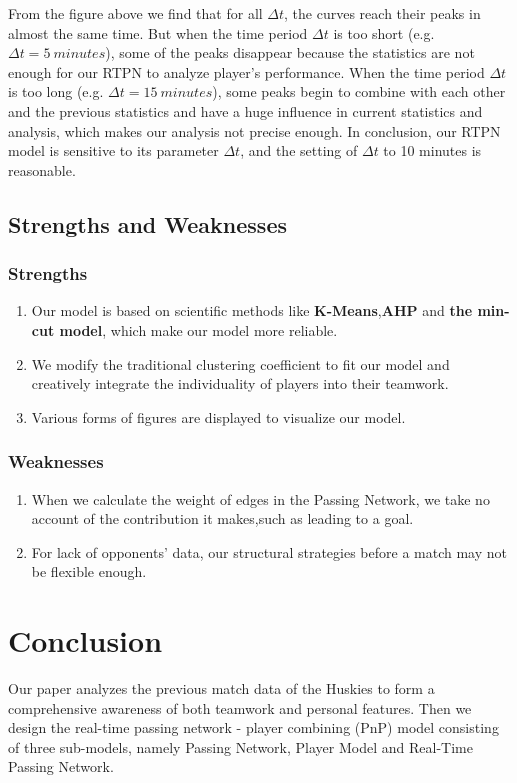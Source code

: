 \documentclass{mcmthesis}
\begin{document}
From the figure above we find that for all $\Delta{t}$, the curves reach their peaks in almost the same time. But when the time period $\Delta{t}$ is too short (e.g. $\Delta{t} = 5\ minutes$), some of the peaks disappear because the statistics are not enough for our RTPN to analyze player's performance. When the time period $\Delta{t}$ is too long (e.g. $\Delta{t} = 15\ minutes$), some peaks begin to combine with each other and the previous statistics and have a huge influence in current statistics and analysis, which makes our analysis not precise enough. In conclusion, our RTPN model is sensitive to its parameter $\Delta{t}$, and the setting of $\Delta{t}$ to 10 minutes is reasonable.

\subsection{Strengths and Weaknesses}
\subsubsection{Strengths}
\begin{enumerate}
\item Our model is based on scientific methods like \textbf{K-Means},\textbf{AHP} and \textbf{the min-cut model}, which make our model more reliable.
\item We modify the traditional clustering coefficient to fit our model and creatively integrate the individuality of players into their teamwork.
\item Various forms of figures are displayed to visualize our model.
\end{enumerate}
\subsubsection{Weaknesses}
\begin{enumerate}
\item When we calculate the weight of edges in the Passing Network, we take no account of the contribution it makes,such as leading to a goal.
\item For lack of opponents' data, our structural strategies before a match may not be flexible enough.
\end{enumerate}


\section{Conclusion} \label{Sec-Conclusion}
Our paper analyzes the previous match data of the Huskies to form a comprehensive awareness of both teamwork and personal features. Then we design the real-time passing network - player combining  (PnP) model consisting of three sub-models, namely Passing Network, Player Model and Real-Time Passing Network.
\end{document}
